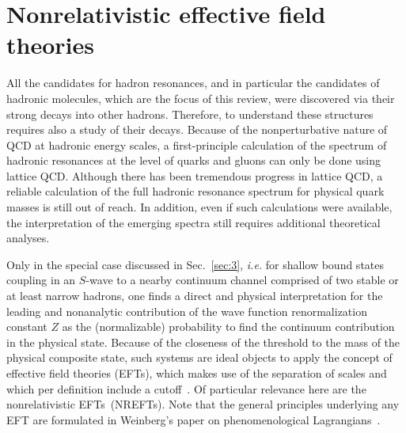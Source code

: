 
\section{Nonrelativistic effective field theories}
\label{sec:4}

All the candidates for hadron resonances, and in particular the candidates of
hadronic molecules, which are the focus of this review, were discovered via
their strong decays into other hadrons. Therefore, to understand these
structures requires  also a study of their decays. Because of the
nonperturbative nature of QCD at hadronic energy scales, a first-principle
calculation of the spectrum of hadronic resonances at the level of quarks and
gluons can only be done using lattice QCD.
Although there has been tremendous progress in lattice QCD, a reliable
calculation of the full hadronic resonance spectrum for physical quark masses is
still out of reach. In addition, even if such calculations were available, the
interpretation of the emerging spectra still requires
 additional theoretical analyses.

Only in the special case discussed in Sec.~\ref{sec:3}, {\sl i.e.} for shallow bound
states coupling in an $S$-wave to a nearby continuum channel comprised of two
stable or at least narrow hadrons, one finds a direct and physical
interpretation for the leading and nonanalytic contribution of the wave function
renormalization constant $Z$ as the (normalizable) probability to find the
continuum contribution in the physical state.
 Because of the closeness of the
threshold to the mass of the physical composite state, such systems are ideal
objects to apply the concept of effective field theories (EFTs), which makes use
of the separation of scales and which per definition include  a
cutoff~\cite{Lepage:1989hf}. Of particular relevance here are the
nonrelativistic EFTs~(NREFTs). Note that the
general principles underlying any EFT are formulated in Weinberg's
paper on phenomenological Lagrangians~\cite{Weinberg:1978kz}.

